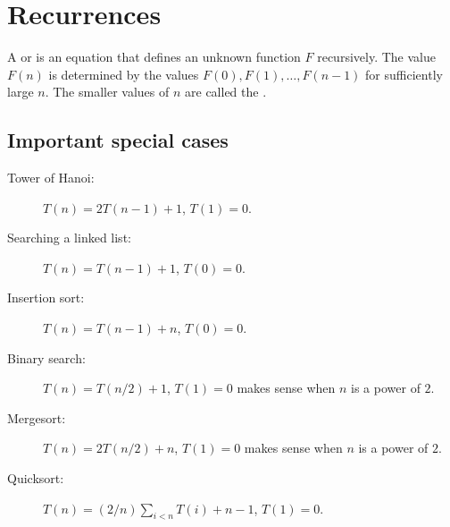 

\chapter{Recurrences} %
\begin{Definition}
A  or  is an
equation that defines an unknown function $F$ recursively. 
The value $F(n)$ is determined by the values $F(0), F(1), \dots, F(n-1)$ for
sufficiently large $n$. The smaller values of $n$ are called the
. 
\end{Definition}

\section{Important special cases}
\begin{description}
  \item[Tower of Hanoi:] $T(n) = 2 T(n - 1) + 1$, $T(1) = 0$.
  \item[Searching a linked list:] $T(n) = T(n - 1) + 1$, $T(0) = 0$.
  \item[Insertion sort:] $T(n) = T(n-1) + n$, $T(0) = 0$.
  \item[Binary search:] $T(n) = T(n/2) + 1$, $T(1) = 0$ makes sense when $n$ is a power of $2$. 
  \item[Mergesort:] $T(n) = 2T(n/2) + n$, $T(1) = 0$ makes sense when $n$ is a power of $2$.
  \item[Quicksort:] $T(n) = (2/n)\sum_{i<n} T(i) + n-1$, $T(1) = 0$.
\end{description}

